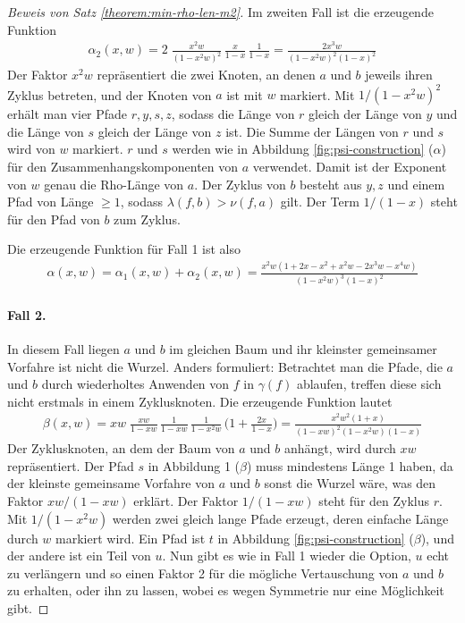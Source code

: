 \documentclass[a4paper, 10pt, ngerman]{article}
\begin{document}
\begin{proof}[Beweis von Satz \ref{theorem:min-rho-len-m2}]
        Im zweiten Fall ist die erzeugende Funktion
        \begin{align*}
            \alpha_2(x, w) =
            2 \; \frac {x^2w} {(1 - x^2w)^2} \, \frac x {1 - x} \,
            \frac {1}{1 - x}
            = \frac {2x^3w} {(1 - x^2w)^2 (1 - x)^2}
        \end{align*}
        Der Faktor $x^2w$ repräsentiert die zwei Knoten, an denen $a$ und $b$ jeweils ihren Zyklus betreten, und der Knoten von $a$ ist mit $w$ markiert. Mit $1 / (1 - x^2w)^2$ erhält man vier Pfade $r, y, s, z$, sodass die Länge von $r$ gleich der Länge von $y$ und die Länge von $s$ gleich der Länge von $z$ ist. Die Summe der Längen von $r$ und $s$ wird von $w$ markiert. $r$ und $s$ werden wie in Abbildung \ref{fig:psi-construction} ($\alpha$) für den Zusammenhangskomponenten von $a$ verwendet. Damit ist der Exponent von $w$ genau die Rho-Länge von $a$. Der Zyklus von $b$ besteht aus $y, z$ und einem Pfad von Länge $\ge 1$, sodass $\lambda(f, b) > \nu(f, a)$ gilt. Der Term $1 / (1 - x)$ steht für den Pfad von $b$ zum Zyklus.

        \noindent Die erzeugende Funktion für Fall 1 ist also
        \begin{align*}
            \alpha(x, w)
            = \alpha_1(x, w) + \alpha_2(x, w)
            = \frac {x^2w(1 + 2x - x^2 + x^2w - 2x^3w - x^4w)}
            {(1 - x^2w)^3(1 - x)^2}
        \end{align*}

        \paragraph{Fall 2.}  In diesem Fall liegen $a$ und $b$ im gleichen Baum und ihr kleinster gemeinsamer Vorfahre ist nicht die Wurzel. Anders formuliert: Betrachtet man die Pfade, die $a$ und $b$ durch wiederholtes Anwenden von $f$ in $\gamma(f)$ ablaufen, treffen diese sich nicht erstmals in einem Zyklusknoten. Die erzeugende Funktion lautet
        \begin{align*}
            \beta(x, w)
            = xw \; \frac {xw} {1 - xw} \, \frac {1} {1 - xw} \,
            \frac {1} {1 - x^2w} \, \Bigg (1 + \frac {2x} {1 - x} \Bigg )
            = \frac {x^2w^2(1 + x)} {(1 - xw)^2(1 - x^2w)(1 - x)}
        \end{align*}
        Der Zyklusknoten, an dem der Baum von $a$ und $b$ anhängt, wird durch $xw$ repräsentiert. Der Pfad $s$ in Abbildung 1 ($\beta$) muss mindestens Länge 1 haben, da der kleinste gemeinsame Vorfahre von $a$ und $b$ sonst die Wurzel wäre, was den Faktor $xw/(1 - xw)$ erklärt. Der Faktor $1/(1 - xw)$ steht für den Zyklus $r$. Mit $1/(1 - x^2w)$ werden zwei gleich lange Pfade erzeugt, deren einfache Länge durch $w$ markiert wird. Ein Pfad ist $t$ in Abbildung \ref{fig:psi-construction} ($\beta$), und der andere ist ein Teil von $u$. Nun gibt es wie in Fall 1 wieder die Option, $u$ echt zu verlängern und so einen Faktor 2 für die mögliche Vertauschung von $a$ und $b$ zu erhalten, oder ihn zu lassen, wobei es wegen Symmetrie nur eine Möglichkeit gibt.



\end{proof}
\end{document}
